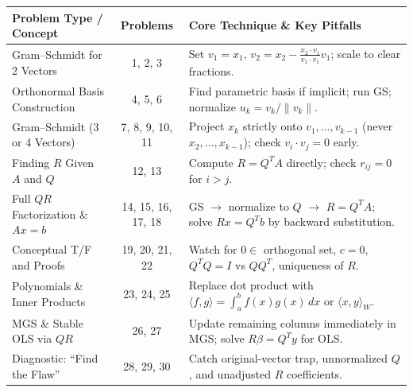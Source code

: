\documentclass[11pt, letterpaper]{article}
\theoremstyle{definition}
\theoremstyle{remark}
\begin{document}
\renewcommand{\arraystretch}{1.5}
\begin{tabularx}{\textwidth}{@{} l c X @{}}
    \toprule
    \textbf{Problem Type / Concept} & \textbf{Problems} & \textbf{Core Technique \& Key Pitfalls} \\
    \midrule
    Gram--Schmidt for 2 Vectors & 1, 2, 3 & Set $v_1 = x_1$, $v_2 = x_2 - \frac{x_2 \cdot v_1}{v_1 \cdot v_1}v_1$; scale to clear fractions. \\
    Orthonormal Basis Construction & 4, 5, 6 & Find parametric basis if implicit; run GS; normalize $u_k = v_k/\|v_k\|$. \\
    Gram--Schmidt (3 or 4 Vectors) & 7, 8, 9, 10, 11 & Project $x_k$ strictly onto $v_1, \dots, v_{k-1}$ (never $x_2, \dots, x_{k-1}$); check $v_i \cdot v_j = 0$ early. \\
    Finding $R$ Given $A$ and $Q$ & 12, 13 & Compute $R = Q^T A$ directly; check $r_{ij} = 0$ for $i > j$. \\
    Full $QR$ Factorization \& $Ax=b$ & 14, 15, 16, 17, 18 & GS $\to$ normalize to $Q$ $\to$ $R = Q^T A$; solve $Rx = Q^T b$ by backward substitution. \\
    Conceptual T/F and Proofs & 19, 20, 21, 22 & Watch for $0 \in$ orthogonal set, $c=0$, $Q^T Q = I$ vs $QQ^T$, uniqueness of $R$. \\
    Polynomials \& Inner Products & 23, 24, 25 & Replace dot product with $\langle f, g \rangle = \int_a^b f(x)g(x)\,dx$ or $\langle x, y \rangle_W$. \\
    MGS \& Stable OLS via $QR$ & 26, 27 & Update remaining columns immediately in MGS; solve $R\beta = Q^T y$ for OLS. \\
    Diagnostic: ``Find the Flaw'' & 28, 29, 30 & Catch original-vector trap, unnormalized $Q$, and unadjusted $R$ coefficients. \\
    \bottomrule
\end{tabularx}
\end{document}
